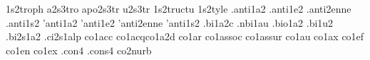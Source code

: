 {1s2troph                                                                        
a2s3tro                                                                         
apo2s3tr                                                                        
u2s3tr                                                                          
1s2tructu                                                                       
1s2tyle                                                                         
.anti1a2                                                                        
.anti1e2                                                                        
.anti2enne                                                                      
.anti1s2                                                                        
'anti1a2                                                                        
'anti1e2                                                                        
'anti2enne                                                                      
'anti1s2                                                                        
.bi1a2c                                                                         
.nbi1au                                                                         
.bio1a2                                                                         
.bi1u2                                                                          
.bi2s1a2                                                                        
.ci2s1alp                                                                       
co1acc                                                                          
co1acqco1a2d                                                                    
co1ar                                                                           
co1assoc                                                                        
co1assur                                                                        
co1au                                                                           
co1ax                                                                           
co1ef                                                                           
co1en                                                                           
co1ex                                                                           
.con4                                                                           
.cons4                                                                          
co2nurb                                                                         
}
